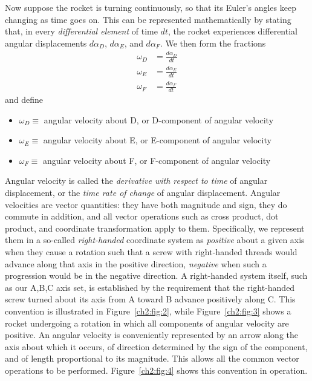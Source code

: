Now suppose the rocket is turning continuously, so that its Euler's angles keep
changing as time goes on. This can be represented mathematically by stating
that, in every \emph{differential element} of time $dt$, the rocket experiences
differential angular displacements $d\alpha_D$, $d\alpha_E$, and $d\alpha_F$.
We then form the fractions
\begin{equation}\label{ch2:eq:1}
\begin{split}
\omega_D &= \frac{d\alpha_D}{dt}\\
\omega_E &= \frac{d\alpha_E}{dt}\\
\omega_F &= \frac{d\alpha_F}{dt}
\end{split}
\end{equation}
and define
\begin{itemize}[nosep,leftmargin=*,label={}]
  \item $\omega_D \equiv$ angular velocity about D, or D-component of angular
  velocity
  \item $\omega_E \equiv$ angular velocity about E, or E-component of angular
  velocity
  \item $\omega_F \equiv$ angular velocity about F, or F-component of angular
  velocity
\end{itemize}
Angular velocity is called the \emph{derivative with respect to time} of
angular displacement, or the \emph{time rate of change} of angular
displacement. Angular velocities are vector quantities: they have both
magnitude and sign, they do commute in addition, and all vector operations such
as cross product, dot product, and coordinate transformation apply to them.
Specifically, we represent them in a so-called \emph{right-handed} coordinate
system as \emph{positive} about a given axis when they cause a rotation such
that a screw with right-handed threads would advance along that axis in the
positive direction, \emph{negative} when such a progression would be in the
negative direction. A right-handed system itself, such as our A,B,C axis set,
is established by the requirement that the right-handed screw turned about its
axis from A toward B advance positively along C. This convention is illustrated
in Figure~\ref{ch2:fig:2}, while Figure~\ref{ch2:fig:3} shows a rocket
undergoing a rotation in which all components of angular velocity are positive.
An angular velocity is conveniently represented by an arrow along the axis
about which it occurs, of direction determined by the sign of the component,
and of length proportional to its magnitude. This allows all the common vector
operations to be performed. Figure~\ref{ch2:fig:4} shows this convention in
operation.

